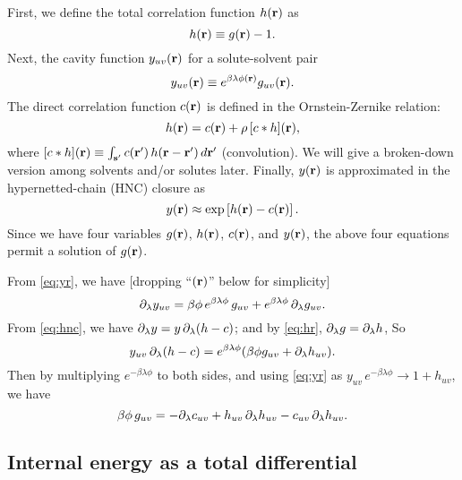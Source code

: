 \documentclass{article}
\begin{document}
First, we define the total correlation function $h(\mathbf{r})$ as
\begin{equation}
  h(\mathbf{r}) \equiv g(\mathbf{r}) - 1.
  \label{eq:hr}
\end{equation}
%
%
%
Next, the cavity function $y_{uv}(\mathbf{r})$ for a solute-solvent pair
\begin{equation}
  y_{uv}(\mathbf{r}) \equiv e^{ \beta \lambda \phi(\mathbf{r}) } g_{uv}(\mathbf{r}).
  \label{eq:yr}
\end{equation}
%
%
%
The direct correlation function $c(\mathbf{r})$
is defined in the Ornstein-Zernike relation:
\begin{equation}
  h(\mathbf{r}) = c(\mathbf{r}) + \rho \, [c * h](\mathbf{r}),
  \label{eq:cr}
\end{equation}
where $[c*h](\mathbf{r}) \equiv \int_{\mathbf{s}'} c(\mathbf{r}') \, h(\mathbf{r} - \mathbf{r}') \, d\mathbf{r}'$
  (convolution).
We will give a broken-down version among solvents and/or solutes later.
%
%
%
%
%
%
Finally, $y(\mathbf{r})$ is approximated in the hypernetted-chain (HNC) closure as
\begin{equation}
  y(\mathbf{r}) \approx \exp\left[ h(\mathbf{r}) - c(\mathbf{r}) \right].
  \label{eq:hnc}
\end{equation}
Since we have four variables
  $g(\mathbf{r})$, $h(\mathbf{r})$, $c(\mathbf{r})$, and $y(\mathbf{r})$,
the above four equations permit a solution of $g(\mathbf{r})$.



From \eqref{eq:yr}, we have [dropping ``$(\mathbf{r})$'' below for simplicity]
\[
  \partial_\lambda y_{uv}
  =
  \beta \phi \, e^{ \beta \lambda \phi } \, g_{uv}
    +
    e^{ \beta \lambda \phi } \, \partial_\lambda g_{uv}.
\]
From \eqref{eq:hnc}, we have $\partial_\lambda y = y \, \partial_\lambda (h - c)$;
and by \eqref{eq:hr}, $\partial_\lambda g = \partial_\lambda h$, So
\[
  y_{uv} \, \partial_\lambda (h - c) = e^{\beta \lambda \phi }
  ( \beta \phi g_{uv} + \partial_\lambda h_{uv} ).
\]
Then by multiplying $e^{-\beta \lambda \phi}$ to both sides,
and using
\eqref{eq:yr}
as $y_{uv} \, e^{-\beta \lambda \phi} \rightarrow 1 + h_{uv}$,
we have
\begin{equation}
  \beta \phi \, g_{uv}
  =
  - \partial_\lambda c_{uv} + h_{uv} \, \partial_\lambda h_{uv} - c_{uv} \, \partial_\lambda h_{uv}.
  \label{eq:hc1}
\end{equation}



\subsection{Internal energy as a total differential}
\end{document}
